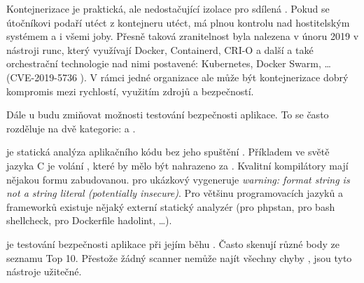         Kontejnerizace je praktická, ale nedostačující izolace pro sdílená \CI. Pokud se útočníkovi podaří utéct z kontejneru utéct, má plnou kontrolu nad hostitelským systémem a i všemi joby. Přesně taková zranitelnost byla nalezena v únoru 2019 v nástroji runc, který využívají Docker, Containerd, CRI-O a další a také orchestrační technologie nad nimi postavené: Kubernetes, Docker Swarm, … (CVE-2019-5736 \cite{CVE-2019-5736}). V rámci jedné organizace ale může být kontejnerizace dobrý kompromis mezi rychlostí, využitím zdrojů a bezpečností.

        Dále u \CI budu zmiňovat možnosti testování bezpečnosti aplikace. To se často rozděluje na dvě kategorie:  a .

         je statická analýza aplikačního kódu bez jeho spuštění \cite{sast}. Příkladem ve světě jazyka C je volání , které by mělo být nahrazeno za . Kvalitní kompilátory mají nějakou formu  zabudovanou.  pro ukázkový  vygeneruje \textit{warning: format string is not a string literal (potentially insecure)}. Pro většinu programovacích jazyků a frameworků existuje nějaký externí statický analyzér (pro  phpstan, pro bash shellcheck, pro Dockerfile hadolint, …).

         je testování bezpečnosti aplikace při jejím běhu \cite{dast}. Často skenují různé body ze seznamu  Top 10. Přestože žádný scanner nemůže najít všechny chyby \cite{netsparker-scanner}, jsou tyto nástroje užitečné.
